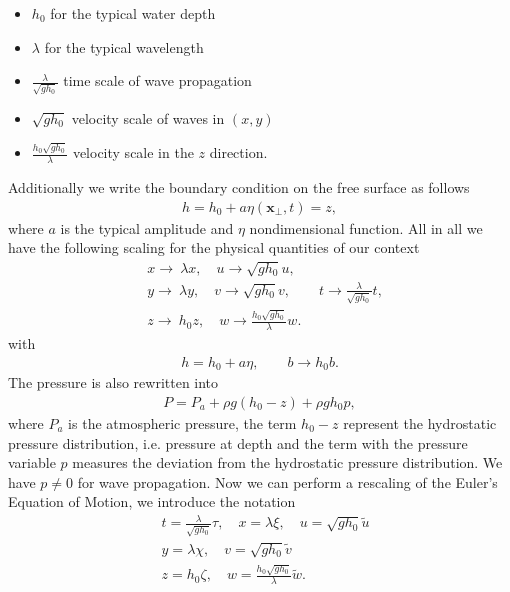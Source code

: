 \begin{itemize}
    \item $h_0$ for the typical water depth
    \item $\lambda$ for the typical wavelength
    \item $\frac{\lambda}{\sqrt{g h_0}}$ time scale of wave propagation
    \item $\sqrt{g h_0}$ velocity scale of waves in $(x, y)$
    \item $\frac{h_0 \sqrt{g h_0} }{\lambda}$ velocity scale in the $z$
        direction.
\end{itemize}
Additionally we write the
boundary condition on the free surface as follows
\begin{align}
    h  = h_0 + a \eta (\mathbf{x}_\perp, t) = z,
\end{align}
where $a$ is the typical amplitude and $\eta$ nondimensional function. All in
all we have the following scaling for the physical quantities of our context
\begin{align}
    &x \rightarrow\ \lambda x, \quad u \rightarrow \sqrt{gh_0} u, \\
      &y \rightarrow\ \lambda y, \quad v \rightarrow \sqrt{gh_0} v, \qquad
      t\rightarrow \frac{\lambda}{\sqrt{gh_0}}t,\\
      &z \rightarrow\ h_0 z, \quad w \rightarrow
    \frac{h_0\sqrt{gh_0}}{\lambda} w.
\end{align}
with
\begin{align}
    h = h_0 + a \eta, \qquad  b \rightarrow h_0 b.
\end{align}
The pressure is also rewritten into
\begin{align}
    P = P_a + \rho g(h_0 -z) + \rho g h_0 p,
\end{align}
where $P_a$ is the atmospheric pressure, the term $h_0-z$ represent the
hydrostatic pressure distribution, i.e. pressure at depth and the term with the pressure
variable $p$  measures the deviation from the hydrostatic pressure
distribution. We have $p\neq 0 $ for wave propagation. Now we can perform a
rescaling of the Euler's Equation of Motion, we introduce the notation
\begin{align}
    &t = \frac{\lambda}{\sqrt{gh_0}}\tau,\quad x = \lambda \xi,\quad u =
    \sqrt{gh_0} \tilde{u}\\
    &y = \lambda \chi,\quad v = \sqrt{gh_0} \tilde{v}\\
    &z = h_0 \zeta, \quad w = \frac{h_0\sqrt{gh_0} }{\lambda}\tilde{w}.
\end{align}
